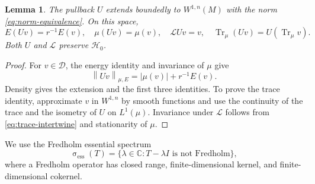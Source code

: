 \documentclass[10pt,a4paper]{amsart}
\newtheorem{lemma}[theorem]{Lemma}
\newcommand{\C}{\mathbb C}
\newcommand{\Lop}{\mathcal L}
\newcommand{\Hcal}{\mathcal H}
\newcommand{\Dcal}{\mathcal D}
\newcommand{\Tr}{\operatorname{Tr}_{\mu}}
\newcommand{\norm}[1]{\left\lVert #1\right\rVert}
\DeclareMathOperator{\spec}{\sigma}
\numberwithin{equation}{section}
\begin{document}
\begin{lemma}\label{lem:U-extension}
The pullback $U$ extends boundedly to $W^{1,n}(M)$ with the norm \eqref{eq:norm-equivalence}. On this space,
\begin{equation}\label{eq:U-extension}
 E(Uv)=r^{-1}E(v),\quad \mu(Uv)=\mu(v),\quad
 \Lop Uv=v,\quad \Tr(Uv)=U(\Tr v).
\end{equation}
Both $U$ and $\Lop$ preserve $\Hcal_0$.
\end{lemma}

\begin{proof}
For $v\in\Dcal$, the energy identity and invariance of $\mu$ give
\[
 \norm{Uv}_{\mu,E}=|\mu(v)|+r^{-1}E(v).
\]
Density gives the extension and the first three identities. To prove the trace identity, approximate $v$ in $W^{1,n}$ by smooth functions and use the continuity of the trace and the isometry of $U$ on $L^1(\mu)$. Invariance under $\Lop$ follows from \eqref{eq:trace-intertwine} and stationarity of $\mu$.
\end{proof}

We use the Fredholm essential spectrum
\[
 \spec_{\mathrm{ess}}(T)=\{\lambda\in\C:T-\lambda I\text{ is not Fredholm}\},
\]
where a Fredholm operator has closed range, finite-dimensional kernel, and finite-dimensional cokernel.
\end{document}
